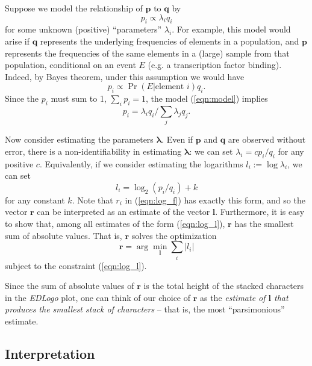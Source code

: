 \documentclass{bmcart}
\def\p{{\mathbf p}}
\def\q{{\mathbf q}}
\def\r{{\mathbf r}}
\def\l{{\mathbf l}}
\begin{document}
Suppose we model the relationship of $\p$ to $\q$ by
 \begin{equation} \label{eqn:model}
 p_i \propto \lambda_i q_i
 \end{equation}
 for some unknown (positive) ``parameters'' $\lambda_i$.
 For example, this model would arise if $\q$ represents the underlying frequencies of elements in a population, and $\p$ represents
 the frequencies of the same elements in a (large) sample from that population, conditional on an event $E$ (e.g. a transcription factor binding).
 Indeed, by Bayes theorem, under this assumption we would have
 \begin{equation}
 p_i \propto \Pr(E| \textrm{element $i$}) q_i.
 \end{equation}
Since the $p_i$ must sum to 1, $\sum_i p_i = 1$, the model (\ref{eqn:model}) implies 
\begin{equation}
p_i = \lambda_i q_i/ \sum_j \lambda_j q_j.
\end{equation}

Now consider estimating the parameters $\mathbf{\lambda}$. 
Even if $\p$ and $\q$ are observed without error, there is a non-identifiability in estimating $\mathbf{\lambda}$:
we can set $\lambda_i = c p_i/q_i$ for any positive $c$.
Equivalently, if we consider estimating 
the logarithms $l_i := \log \lambda_i$, we can set
\begin{equation} \label{eqn:log_l}
l_i = \log_2(p_i/q_i) + k
\end{equation}
for any constant $k$.
Note that $r_i$ in (\ref{eqn:log_f}) has exactly this form,
and so the vector $\r$ can be interpreted as an estimate of the vector $\l$.
Furthermore, it is easy to show that, among all estimates
of the form (\ref{eqn:log_l}), $\r$ has the smallest sum of absolute values.
That is, $\r$ solves the optimization
\begin{equation} \label{eqn:r_opt}
\r = \arg \min_{\l} \sum_i |l_i| 
\end{equation}
subject to the constraint (\ref{eqn:log_l}).

Since the sum of absolute values of $\r$ is the total height of the stacked characters in the \textit{EDLogo} plot, one can think of our choice of $\r$ as the \textit{estimate of $\l$ that produces the smallest
stack of characters} -- that is, the most ``parsimonious'' estimate.

\subsection*{Interpretation}
\end{document}
